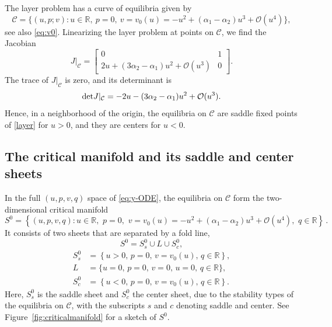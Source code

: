 \documentclass[11pt]{article}
\numberwithin{equation}{section}
\begin{document}
The layer problem has a curve of equilibria given by
\begin{equation}
   \mathcal{C} = \{ (u,p;v): u\in \mathbb R, \ 
   p=0, \  v = v_0(u) = - u^2 + (\alpha_1 - \alpha_2) u^3 + \mathcal{O}(u^4) \},
\end{equation}
see also \eqref{eq:v0}.
Linearizing the layer problem at points on $\mathcal{C}$, we find the  Jacobian 
\begin{equation*}
    J \vert_{\mathcal{C}} = 
    \left[ 
    \begin{array}{cc}
      0 & 1 \\
      2u + (3\alpha_2 - \alpha_1) u^2 +\mathcal{O}(u^3)& 0
    \end{array} 
    \right].
\end{equation*}
%
The trace of $J\vert_{\mathcal{C}}$ is zero, and its determinant is 
\begin{equation}\label{eq:detJ}
{\rm det} J\vert_{\mathcal{C}} = -2u - (3\alpha_2 - \alpha_1) u^2 + \mathcal{O}(u^3).
\end{equation}
Hence, in a neighborhood of the origin, the equilibria on $\mathcal{C}$ are saddle fixed points of \eqref{layer} for $u>0$, 
and they are centers for $u<0$.


\subsection{The critical manifold and its saddle and center sheets}

In the full $(u,p,v,q)$ space of \eqref{eq:y-ODE}, the equilibria on $\mathcal{C}$ form the two-dimensional critical manifold 
\begin{equation} \label{criticalmanifold}
    S^0 = \left\{ (u,p,v,q): 
        u \in \mathbb{R}, \, \, 
          p = 0, \, \, v = v_0(u) = -u^2 +(\alpha_1-\alpha_2) u^3 + \mathcal{O}(u^4), \, \, q \in \mathbb{R} 
        \right\} \, .
\end{equation}
It consists of two sheets that are separated by a fold line,  
\begin{equation}\label{eq:union}
S^0  = S^0_s \cup  L \cup S^0_c,
\end{equation}
\begin{equation*} 
\begin{split}
    S^0_s &= \left\{
          u >0, \, p = 0, \, v=v_0(u), \, q \in \mathbb{R}
        \right\}, \\
    L &= \{ u = 0, \, p=0, \, v=0, \, u=0, \, q \in \mathbb{R} \}, \\ 
    S^0_c &= \left\{
          u < 0, \, p = 0, \, v=v_0(u), \, q \in \mathbb{R}
        \right\}.
\end{split}
\end{equation*}
Here, $S_s^0$ is the saddle sheet and $S_c^0$ the center sheet, due to the stability types of the equilibria on $\mathcal{C}$, with the subscripts $s$ and $c$ denoting saddle and center. 
See Figure~\ref{fig:criticalmanifold} for a sketch of $S^0$.
\end{document}
